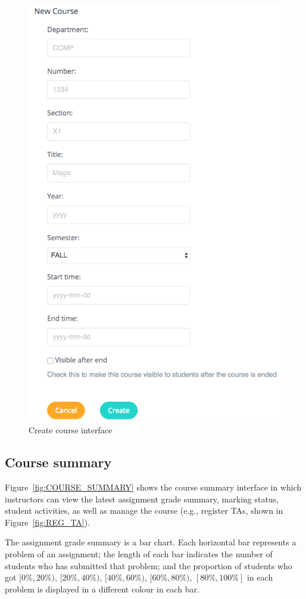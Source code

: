 \begin{figure}[H]
    \centering
        \includegraphics[width=.6\textwidth]{figures/create-courses}
    \caption{Create course interface}
    \label{fig:NEW_COURSE}
\end{figure}

\subsection{Course summary}
Figure~\ref{fig:COURSE_SUMMARY} shows the course summary interface in which
instructors can view the latest assignment grade summary, marking status,
student activities, as well as manage the course (e.g., register TAs, shown
in Figure~\ref{fig:REG_TA}).

The assignment grade summary is a bar chart. Each horizontal bar represents
a problem of an assignment; the length of each bar indicates the number
of students who has submitted that problem; and the proportion of students who
got $[0\%, 20\%)$, $[20\%, 40\%)$, $[40\%, 60\%)$, $[60\%, 80\%)$,
$[80\%, 100\%]$ in each problem is displayed in a different colour in each bar.

